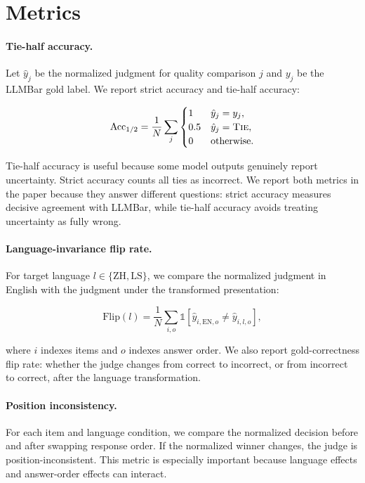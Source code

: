 \documentclass[10pt,twocolumn]{article}
\begin{document}
\section{Metrics}

\paragraph{Tie-half accuracy.}
Let $\hat{y}_j$ be the normalized judgment for quality comparison $j$ and $y_j$ be the LLMBar gold label. We report strict accuracy and tie-half accuracy:

\[
\mathrm{Acc}_{1/2} =
\frac{1}{N}\sum_j
\begin{cases}
1 & \hat{y}_j = y_j,\\
0.5 & \hat{y}_j = \textsc{Tie},\\
0 & \text{otherwise}.
\end{cases}
\]

Tie-half accuracy is useful because some model outputs genuinely report uncertainty. Strict accuracy counts all ties as incorrect. We report both metrics in the paper because they answer different questions: strict accuracy measures decisive agreement with LLMBar, while tie-half accuracy avoids treating uncertainty as fully wrong.

\paragraph{Language-invariance flip rate.}
For target language $l \in \{\mathrm{ZH},\mathrm{LS}\}$, we compare the normalized judgment in English with the judgment under the transformed presentation:

\[
\mathrm{Flip}(l)=
\frac{1}{N}\sum_{i,o}\mathbb{1}
[\hat{y}_{i,\mathrm{EN},o}\neq\hat{y}_{i,l,o}],
\]

where $i$ indexes items and $o$ indexes answer order. We also report gold-correctness flip rate: whether the judge changes from correct to incorrect, or from incorrect to correct, after the language transformation.

\paragraph{Position inconsistency.}
For each item and language condition, we compare the normalized decision before and after swapping response order. If the normalized winner changes, the judge is position-inconsistent. This metric is especially important because language effects and answer-order effects can interact.
\end{document}
